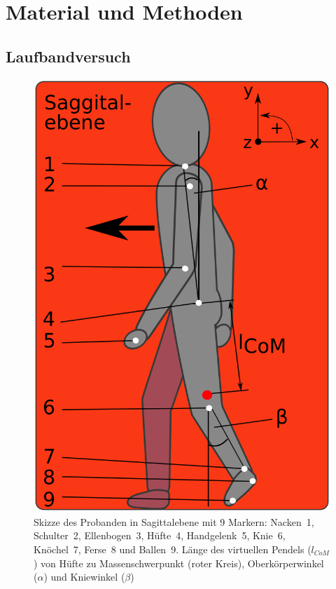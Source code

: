 \section{Material und Methoden}
\subsection{Laufbandversuch}
\begin{figure}
	\vspace{-10pt}
	\includegraphics[width=\linewidth]{bilder/Einleitung/Proband_Pendel}
	\caption[Untersuchte Parameter]{Skizze des Probanden in Sagittalebene mit 9 Markern: Nacken~1, Schulter~2, Ellenbogen~3, Hüfte~4, Handgelenk~5, Knie~6, Knöchel~7, Ferse~8 und Ballen~9. Länge des virtuellen Pendels ($l_{CoM}$) von Hüfte zu Massenschwerpunkt (roter Kreis), Oberkörperwinkel ($\alpha$) und Kniewinkel ($\beta$)}
	\label{fig:Proband_Pendel}
\end{figure}

